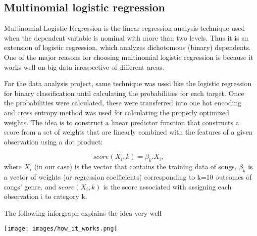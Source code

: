 \documentclass[journal]{IEEEtran}
\begin{document}
\subsection{Multinomial logistic regression}
Multinomial Logistic Regression is the linear regression analysis technique used when the dependent variable is nominal with more than two levels. Thus it is an extension of logistic regression, which analyzes dichotomous (binary) dependents. One of the major reasons for choosing multinomial logistic regression is because it works well on big data irrespective of different areas. \par
For the data analysis project, same technique was used like the logistic regression for binary classification until calculating the probabilities for each target. Once the probabilities were calculated, these were transferred into one hot encoding and cross entropy method was used for calculating the properly optimized weights. The idea is to construct a linear predictor function that constructs a score from a set of weights that are linearly combined with the features of a given observation using a dot product: \par
\begin{equation}
	score(X_i,k) = \beta_k . X_i,
\end{equation}
where $X_i$ (in our case) is the vector that contains the training data of songs, $\beta_k$ is a vector of weights (or regression coefficients) corresponding to k=10 outcomes of songs' genre, and $score(X_i, k)$ is the score associated with assigning each observation i to category k. \par
The following inforgraph explains the idea very well \par
\begin{center}
	\texttt{[image: images/how\_it\_works.png]}
\end{center}
\end{document}
